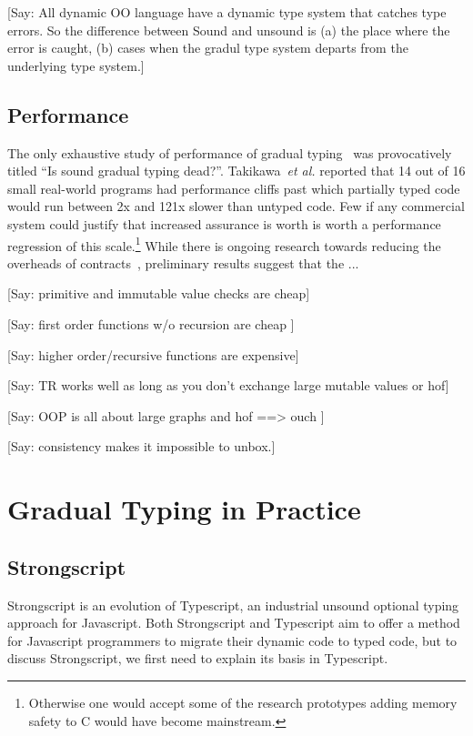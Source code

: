\documentclass[a4paper,USenglish]{tex/lipics-v2016}
\begin{document}
[Say: All dynamic OO language have a dynamic type system that catches type errors.  So the difference between Sound and unsound is (a) the place where the error is caught, (b) cases when the gradul type system departs from the underlying type system.]  

\subsection{Performance}

The only exhaustive study of performance of gradual typing~\cite{popl16} was
provocatively titled ``Is sound gradual typing dead?''.  Takikawa~\emph{et
  al.}  reported that 14 out of 16 small real-world programs had performance
cliffs past which partially typed code would run between 2x and 121x slower
than untyped code. Few if any commercial system could justify that increased
assurance is worth is worth a performance regression of this
scale.\footnote{Otherwise one would accept some of the research prototypes
  adding memory safety to C would have become mainstream.} While there is
ongoing research towards reducing the overheads of
contracts~\cite{pycket15}, preliminary results suggest that the ...


[Say: primitive and immutable value checks are cheap]

[Say: first order functions w/o recursion are cheap ]

[Say: higher order/recursive functions are expensive]

[Say: TR works well as long as you don't exchange large mutable values or hof]

[Say: OOP is all about large graphs and hof ==> ouch ]

[Say: consistency makes it impossible to unbox.]

\section{Gradual Typing in Practice}

\subsection{Strongscript}

Strongscript is an evolution of Typescript, an industrial unsound optional
typing approach for Javascript. Both Strongscript and Typescript aim to
offer a method for Javascript programmers to migrate their dynamic code
to typed code, but to discuss Strongscript, we first need to explain its 
basis in Typescript.
\end{document}
